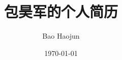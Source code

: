\documentclass[11pt,dvipdfmx,CJKbookmarks]{article}
\author{Bao Haojun}
\date{\today}
\title{包昊军的个人简历}
\begin{document}
\maketitle
\begin{CJK*}{UTF8}{simsun}

\end{CJK*}
\end{document}
